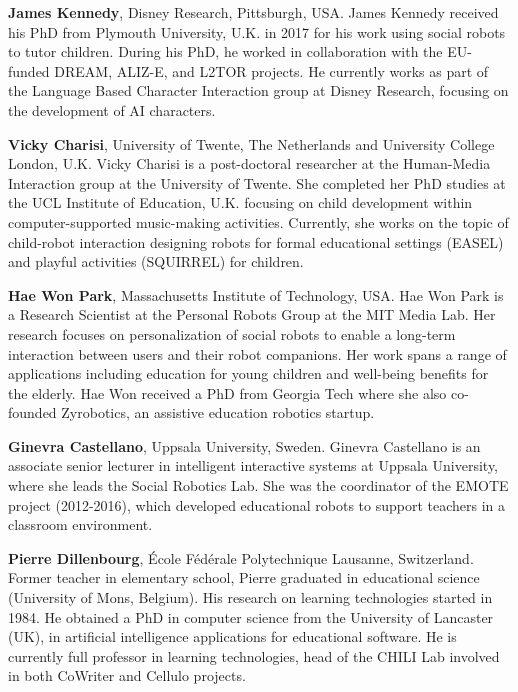 \documentclass{sig-alternate-05-2015}
\begin{document}
\textbf{James Kennedy}, Disney Research, Pittsburgh, USA. James Kennedy received his PhD from Plymouth University, U.K. in 2017 for his work using social robots to tutor children. During his PhD, he worked in collaboration with the EU-funded DREAM, ALIZ-E, and L2TOR projects. He currently works as part of the Language Based Character Interaction group at Disney Research, focusing on the development of AI characters.

\textbf{Vicky Charisi}, University of Twente, The Netherlands and University College London, U.K. Vicky Charisi is a post-doctoral researcher at the Human-Media Interaction group at the University of Twente. She completed her PhD studies at the UCL Institute of Education, U.K. focusing on child development within computer-supported music-making activities. Currently, she works on the topic of child-robot interaction designing robots for formal educational settings (EASEL) and playful activities (SQUIRREL) for children.

\textbf{Hae Won Park}, Massachusetts Institute of Technology, USA. Hae Won Park is a Research Scientist at the Personal Robots Group at the MIT Media Lab. Her research focuses on personalization of social robots to enable a long-term interaction between users and their robot companions. Her work spans a range of applications including education for young children and well-being benefits for the elderly. Hae Won received a PhD from Georgia Tech where she also co-founded Zyrobotics, an assistive education robotics startup.

\textbf{Ginevra Castellano}, Uppsala University, Sweden. Ginevra Castellano is an associate senior lecturer in intelligent interactive systems at Uppsala University, where she leads the Social Robotics Lab. She was the coordinator of the EMOTE project (2012-2016), which developed educational robots to support teachers in a classroom environment.

\textbf{Pierre Dillenbourg}, École Fédérale Polytechnique Lausanne, Switzerland. Former teacher in elementary school, Pierre graduated in educational science (University of Mons, Belgium). His research on learning technologies started in 1984. He obtained a PhD in computer science from the University of Lancaster (UK), in artificial intelligence applications for educational software. He is currently full professor in learning technologies, head of the CHILI Lab involved in both CoWriter and Cellulo projects.
\end{document}
